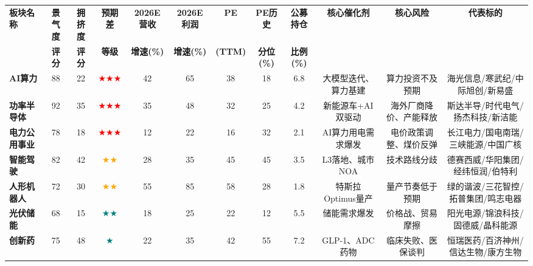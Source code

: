 \begin{table}[htbp]
  \centering
  \scriptsize
  \renewcommand{\arraystretch}{1.3}
  \setlength{\tabcolsep}{3.5pt}
  \begin{tabular}{@{}lccccccccccc@{}}
    \toprule
    \textbf{板块名称} & \textbf{景气度} & \textbf{拥挤度} & \textbf{预期差} & \textbf{2026E营收} & \textbf{2026E利润} & \textbf{PE} & \textbf{PE历史} & \textbf{公募持仓} & \textbf{核心催化剂} & \textbf{核心风险} & \textbf{代表标的} \\
    & \textbf{评分} & \textbf{评分} & \textbf{等级} & \textbf{增速(\%)} & \textbf{增速(\%)} & \textbf{(TTM)} & \textbf{分位(\%)} & \textbf{比例(\%)} & & & \\
    \midrule
    \textbf{AI算力} & 88 & 22 & \textcolor{red}{$\bigstar\bigstar\bigstar$} & 42 & 65 & 38 & 18 & 6.8 & 大模型迭代、算力基建 & 算力投资不及预期 & 海光信息/寒武纪/中际旭创/新易盛 \\
    \addlinespace
    \textbf{功率半导体} & 92 & 35 & \textcolor{red}{$\bigstar\bigstar\bigstar$} & 35 & 48 & 32 & 25 & 4.2 & 新能源车+AI双驱动 & 海外厂商降价、产能释放 & 斯达半导/时代电气/扬杰科技/新洁能 \\
    \addlinespace
    \textbf{电力公用事业} & 78 & 18 & \textcolor{red}{$\bigstar\bigstar\bigstar$} & 12 & 22 & 16 & 32 & 2.1 & AI算力用电需求爆发 & 电价政策调整、煤价反弹 & 长江电力/国电南瑞/三峡能源/中国广核 \\
    \addlinespace
    \textbf{智能驾驶} & 82 & 42 & \textcolor{orange}{$\bigstar\bigstar$} & 28 & 35 & 45 & 45 & 3.5 & L3落地、城市NOA & 技术路线分歧 & 德赛西威/华阳集团/经纬恒润/伯特利 \\
    \addlinespace
    \textbf{人形机器人} & 72 & 30 & \textcolor{orange}{$\bigstar\bigstar$} & 55 & 85 & 58 & 28 & 1.8 & 特斯拉Optimus量产 & 量产节奏低于预期 & 绿的谐波/三花智控/拓普集团/鸣志电器 \\
    \addlinespace
    \textbf{光伏储能} & 68 & 15 & \textcolor{teal}{$\bigstar\bigstar$} & 18 & 25 & 22 & 12 & 5.5 & 储能需求爆发 & 价格战、贸易摩擦 & 阳光电源/锦浪科技/固德威/晶科能源 \\
    \addlinespace
    \textbf{创新药} & 75 & 48 & \textcolor{teal}{$\bigstar$} & 22 & 35 & 42 & 55 & 7.2 & GLP-1、ADC药物 & 临床失败、医保谈判 & 恒瑞医药/百济神州/信达生物/康方生物 \\
    \bottomrule
  \end{tabular}

\end{table}
